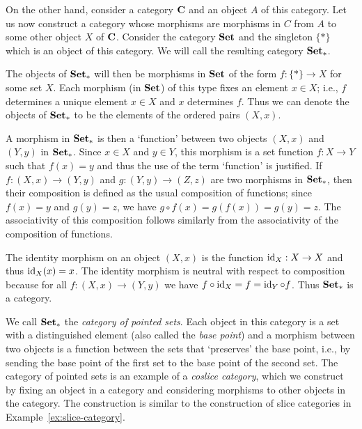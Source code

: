 \begin{example}
    \label{ex:coslice-category}
    On the other hand, consider a category \(\mathbf{C}\) and an object \(A\) of
    this category. Let us now construct a category whose morphisms are morphisms
    in \(C\) from \(A\) to some other object \(X\) of \(\mathbf{C}\). Consider the
    category \(\mathbf{Set}\) and the singleton \(\{*\}\) which is an object of this
    category. We will call the resulting category \(\mathbf{Set_*}\).

    The objects of \(\mathbf{Set_*}\) will then be morphisms in \(\mathbf{Set}\) of the
    form \(f: \{*\} \to X\) for some set \(X\). Each morphism (in \(\mathbf{Set}\)) of
    this type fixes an element \(x \in X\); i.e., \(f\) determines a unique
    element \(x \in X\) and \(x\) determines \(f\). Thus we can denote the
    objects of \(\mathbf{Set_*}\) to be the elements of the ordered pairs \((X,
    x)\).

    A morphism in \(\mathbf{Set_*}\) is then a `function' between two objects
    \((X, x)\) and \((Y, y)\) in \(\mathbf{Set_*}\). Since \(x \in X\) and \(y \in
    Y\), this morphism is a set function \(f : X \to Y\) such that \(f(x) = y\)
    and thus the use of the term `function' is justified. If \(f : (X, x) \to
    (Y, y)\) and \(g : (Y, y) \to (Z, z)\) are two morphisms in
    \(\mathbf{Set_*}\), then their composition is defined as the usual composition
    of functions; since \(f(x) = y\) and \(g(y) = z\), we have \(g \circ f(x) =
    g(f(x)) = g(y) = z\). The associativity of this composition follows
    similarly from the associativity of the composition of functions.

    The identity morphism on an object \((X, x)\) is the function \(\operatorname{id}_X : X
    \to X\) and thus \(\operatorname{id}_X(x) = x\). The identity morphism is neutral with
    respect to composition because for all \(f : (X, x) \to (Y, y)\) we have \(f
    \circ \operatorname{id}_X = f = \operatorname{id}_Y \circ f\). Thus \(\mathbf{Set_*}\) is a category.

    We call \(\mathbf{Set_*}\) the \emph{category of pointed sets}. Each object in
    this category is a set with a distinguished element (also called the
    \emph{base point}) and a morphism between two objects is a function between
    the sets that `preserves' the base point, i.e., by sending the base point of
    the first set to the base point of the second set. The category of pointed
    sets is an example of a \emph{coslice category}, which we construct by
    fixing an object in a category and considering morphisms to other objects in
    the category. The construction is similar to the construction of slice
    categories in Example~\ref{ex:slice-category}.
\end{example}

